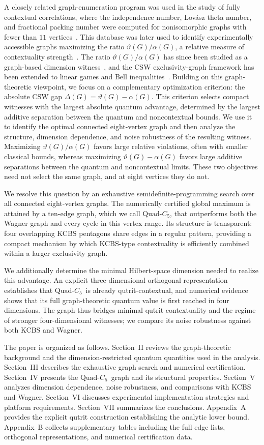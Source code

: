 \documentclass[aps,pra,twocolumn,superscriptaddress,longbibliography,floatfix]{revtex4-2}
\newcommand{\vt}{\vartheta}
\newcommand{\al}{\alpha}
\newcommand{\De}{\Delta}
\newcommand{\QC}{\ensuremath{\text{Quad-}C_5}}
\begin{document}
A closely related graph-enumeration program was used in the study of fully
contextual correlations, where the independence number, Lov\'{a}sz theta
number, and fractional packing number were computed for nonisomorphic graphs
with fewer than $11$ vertices~\cite{Amselem2012}. This database was later
used to identify experimentally accessible graphs maximizing the ratio
$\vt(G)/\al(G)$, a relative measure of contextuality
strength~\cite{Canas2016}.
The ratio $\vt(G)/\al(G)$ has since been studied as a graph-based
dimension witness~\cite{Ray2021}, and the CSW exclusivity-graph
framework has been extended to linear games and Bell
inequalities~\cite{Gnacinski2016}.
Building on this graph-theoretic viewpoint, we
focus on a complementary optimization criterion: the absolute CSW gap
$\De(G)=\vt(G)-\al(G)$. This criterion selects compact witnesses with the
largest absolute quantum advantage, determined by the largest additive
separation between the quantum and noncontextual bounds. We use it to
identify the optimal connected eight-vertex graph and then analyze the
structure, dimension dependence, and noise robustness of the resulting
witness. Maximizing $\vt(G)/\al(G)$ favors large relative violations, often
with smaller classical bounds, whereas maximizing $\vt(G)-\al(G)$ favors
large additive separations between the quantum and noncontextual limits.
These two objectives need not select the same graph, and at eight vertices
they do not.

We resolve this question by an exhaustive semidefinite-programming search
over all connected eight-vertex graphs. The numerically certified global maximum is attained by a
ten-edge graph, which we call \QC, that outperforms both the Wagner graph
and every cycle in this vertex range. Its structure is transparent: four
overlapping KCBS pentagons share edges in a regular pattern, providing a
compact mechanism by which KCBS-type contextuality is efficiently combined
within a larger exclusivity graph.

We additionally determine the minimal Hilbert-space dimension needed to
realize this advantage. An explicit three-dimensional orthogonal
representation establishes that \QC\ is already qutrit-contextual, and
numerical evidence shows that its full graph-theoretic quantum value is
first reached in four dimensions. The graph thus bridges minimal qutrit
contextuality and the regime of stronger four-dimensional witnesses;
we compare its noise robustness against both KCBS and Wagner.

The paper is organized as follows. Section~II reviews the graph-theoretic
background and the dimension-restricted quantum quantities used in the
analysis. Section~III describes the exhaustive graph search and numerical
certification. Section~IV presents the \QC\ graph and its structural
properties. Section~V analyzes dimension dependence, noise robustness, and
comparisons with KCBS and Wagner. Section~VI discusses experimental
implementation strategies and platform requirements. Section~VII summarizes
the conclusions. Appendix~A provides the explicit qutrit construction
establishing the analytic lower bound. Appendix~B collects supplementary
tables including the full edge lists, orthogonal representations, and
numerical certification data.
\end{document}
